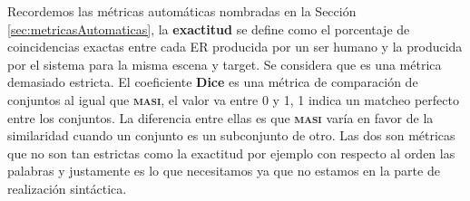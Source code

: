 



Recordemos las m\'etricas autom\'aticas nombradas en la Secci\'on \ref{sec:metricasAutomaticas}, 
la \textbf{exactitud} se define como el porcentaje de coincidencias exactas entre cada ER producida por un ser humano y la producida por el sistema para la misma escena y target. Se considera que es una m\'etrica demasiado estricta. 
El coeficiente \textbf{Dice} es una m\'etrica de comparaci\'on de conjuntos al igual que \textbf{\textsc{masi}}, el valor va entre 0 y 1, 1 indica un matcheo perfecto entre los conjuntos. La diferencia entre ellas es que \textbf{\textsc{masi}} var\'ia en favor de la similaridad cuando un conjunto es un subconjunto de otro. Las dos son m\'etricas que no son tan estrictas como la exactitud por ejemplo con respecto al orden las palabras y justamente es lo que necesitamos ya que no estamos en la parte de realizaci\'on sint\'actica.

